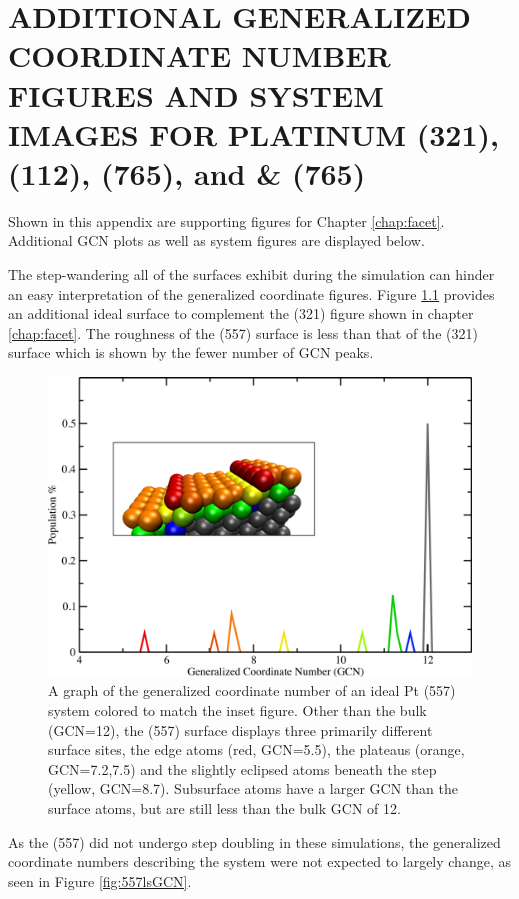 
\chapter{ADDITIONAL GENERALIZED COORDINATE NUMBER FIGURES AND SYSTEM IMAGES FOR PLATINUM (321), (112), (765), and \& (765)}
\label{app:SI2}


Shown in this appendix are supporting figures for Chapter \ref{chap:facet}.
Additional GCN plots as well as system figures are displayed below.
\newpage



The step-wandering all of the surfaces exhibit during the simulation can hinder
an easy interpretation of the generalized coordinate figures. Figure
\ref{fig:557GCN} provides an additional ideal surface to complement the (321)
figure shown in chapter \ref{chap:facet}. The roughness of the (557) surface is
less than that of the (321) surface which is shown by the fewer number of GCN
peaks. 

\begin{figure}
\centering
\includegraphics[width=0.9\linewidth]{../figures/appB/557_ideal_gcn.pdf}
\caption{A graph of the generalized coordinate number of an ideal Pt (557)
system colored to match the inset figure. Other than the bulk (GCN=12), the
(557) surface displays three primarily different surface sites, the edge atoms
(red, GCN=5.5), the plateaus (orange, GCN=7.2,7.5) and the slightly eclipsed
atoms beneath the step (yellow, GCN=8.7). Subsurface atoms have a larger GCN
than the surface atoms, but are still less than the bulk GCN of 12.}
\label{fig:557GCN}
\end{figure}
\newpage


As the  (557) did not undergo step doubling in these simulations, the
generalized coordinate numbers describing the system were not expected to
largely change, as seen in Figure \ref{fig:557lsGCN}.

